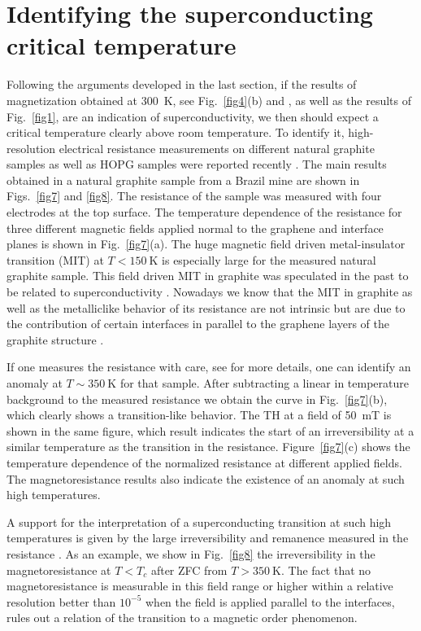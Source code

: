 \documentclass[aps,dvipsnames,twocolumn,floatfix,amsmath]{revtex4-1}
\begin{document}
\section{Identifying the superconducting critical temperature}
\label{Tc}





Following the arguments developed in the last section,  if the results of magnetization
obtained at 300~K, see Fig.~\ref{fig4}(b) and \cite{schcar},  as well as the results of Fig.~\ref{fig1},
are an indication
of superconductivity, we then should
expect a critical temperature clearly above room temperature. To identify it, high-resolution
electrical resistance measurements on different natural graphite samples as well as HOPG samples
were reported recently \cite{pre16}. The main results obtained in a natural graphite sample from a
Brazil mine are shown in Figs.~\ref{fig7} and \ref{fig8}. The resistance of the sample was measured with  four electrodes
at the top surface. The temperature dependence of the resistance for three different magnetic fields applied normal
to the graphene and interface planes is shown in Fig.~\ref{fig7}(a). The huge magnetic field driven
metal-insulator transition (MIT) at $T < 150~$K is especially large for the measured natural graphite sample. This
 field driven MIT in graphite was speculated in the past to be  related to superconductivity \cite{kempa00,yakovadv03}.
Nowadays we know that the MIT in graphite as well as the metalliclike behavior of its resistance
are not intrinsic but are due to the contribution of certain interfaces in parallel to the graphene layers
of the graphite structure \cite{bar08,zor17,chap7}.

If one measures the resistance with care, see \cite{pre16} for more details, one can identify an anomaly
at $T \sim 350~$K for that sample. After subtracting a linear in temperature background to the measured
resistance we obtain the curve in  Fig.~\ref{fig7}(b), which clearly shows a transition-like behavior.
The TH at a field of 50~mT is shown in the same figure, which result indicates the start of
an irreversibility  at a similar temperature as the transition in the resistance. Figure~\ref{fig7}(c) shows the
temperature dependence of the normalized resistance at different applied fields. The magnetoresistance results also indicate
the existence of an anomaly at such high temperatures.



A  support for the interpretation of a superconducting transition at such high temperatures is
given by the large irreversibility and remanence measured in the resistance \cite{pre16}. As an
example, we show in Fig.~\ref{fig8} the irreversibility in the magnetoresistance at $T < T_c$ after
ZFC from $T > 350~$K. The fact that no magnetoresistance is measurable in this field range or higher within a
relative resolution
better than $10^{-5}$ when the field is applied parallel to the interfaces, rules out a relation
of the transition to a magnetic order phenomenon.
\end{document}
